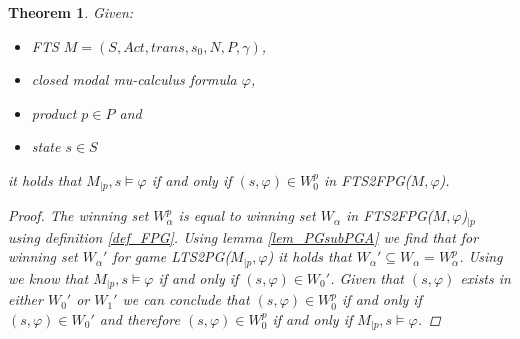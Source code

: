 \documentclass[]{article}
\newtheorem{theorem}{Theorem}[section]
\begin{document}
\begin{theorem}
	\label{the_FPG_ver_FTS}
	Given:
	\begin{itemize}
		\item FTS $M = (S, Act, trans, s_0, N, P, \gamma)$,
		\item closed modal mu-calculus formula $\varphi$,
		\item product $p \in P$ and
		\item state $s \in S$
	\end{itemize}
it holds that $M_{|p}, s \models \varphi$ if and only if $(s, \varphi) \in W_0^p$ in FTS2FPG($M, \varphi$).
\begin{proof}
	The winning set $W_\alpha^p$ is equal to winning set $W_\alpha$ in FTS2FPG($M, \varphi$)$_{|p}$ using definition \ref{def_FPG}. Using lemma \ref{lem_PGsubPGA} we find that for winning set $W_\alpha'$ for game LTS2PG($M_{|p}, \varphi$) it holds that $W_\alpha' \subseteq W_\alpha = W_\alpha^p$. Using \cite{Bradfield2018} we know that $M_{|p}, s \models \varphi$ if and only if $(s, \varphi) \in W_0'$. Given that $(s, \varphi)$ exists in either $W_0'$ or $W_1'$ we can conclude that $(s, \varphi) \in W_0^p$ if and only if $(s, \varphi) \in W_0'$ and therefore $(s, \varphi) \in W_0^p$ if and only if  $M_{|p}, s \models \varphi$.
\end{proof}
\end{theorem}
\end{document}
